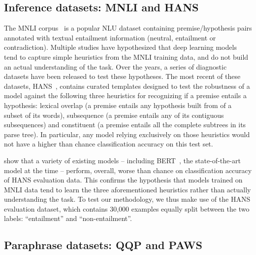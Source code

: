

\subsection{Inference datasets: MNLI and HANS}
\label{sec:dataset}
The MNLI corpus~\citep{williams2017broad} is a popular NLU dataset containing premise/hypothesis pairs annotated with textual entailment information (neutral, entailment or contradiction). Multiple studies have hypothesized that deep learning models tend to capture simple heuristics from the MNLI training data, and do not build an actual understanding of the task. Over the years, a series of diagnostic datasets have been released to test these hypotheses.
The most recent of these datasets, HANS~\citep[Heuristic Analysis for NLI Systems]{linzen2019right}, contains curated templates designed to test the robustness of a model against the following three heuristics for recognizing if a premise entails a hypothesis: lexical overlap (a premise entails any hypothesis built from of a subset of its words), subsequence (a premise entails any of its contiguous subsequences) and constituent (a premise entails all the complete subtrees in its parse tree). In particular, any model relying exclusively on those heuristics would not have a higher than chance classification accuracy on this test set.

\citet{linzen2019right} show that a variety of existing models -- including BERT~\citep{devlin2018bert}, the state-of-the-art model at the time -- perform, overall, worse than chance on classification accuracy of HANS evaluation data. This confirms the hypothesis that models trained on MNLI data tend to learn the three aforementioned heuristics rather than actually understanding the task. To test our methodology, we thus make use of the HANS evaluation dataset, which contains 30,000 examples equally split between the two labels: ``entailment'' and ``non-entailment''.

\subsection{Paraphrase datasets: QQP and PAWS}
\label{sec:dataset_qqp}

